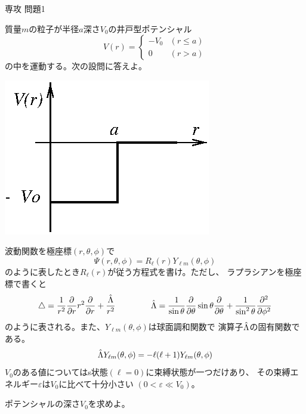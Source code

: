 \documentclass[fleqn]{jbook}
\begin{document}
\begin{question}{専攻 問題1}{}


\parbox[t]{100mm}{
質量$m$の粒子が半径$a$深さ$V_{0}$の井戸型ポテンシャル
%
\[ V(r)= \left\{ \begin{array}{lc}%
         -V_{0} & (r \leq a) \\
             0  & (r>a)      \end{array} \right. \]
%
の中を運動する。次の設問に答えよ。
%
}\parbox[t]{60mm}{\vspace*{-8mm}
\begin{center}
  \mbox{\includegraphics[clip]{1995phy1-1.eps}}
\end{center}}
%

\begin{subquestions}
\SubQuestion

  波動関数を極座標$(r,\theta,\phi)$で
  \[ \Psi (r ,\theta ,\phi )=R_{\ell}(r)Y_{\ell m}(\theta,\phi) \]
  のように表したとき$R_{\ell}(r)$が従う方程式を書け。ただし、
  ラプラシアンを極座標で書くと
%
  \[ \Laplacian = \frac{1}{r^2} \Partial{}{r}r^2 \Partial{}{r}%
                + \frac{\Operator{\Lambda}}{r^2}  \hspace{15mm}%
     \Operator{\Lambda} = \frac{1}{\sin \theta} \Partial{}{\theta} \sin\theta \Partial{}{\theta}%
                + \frac{1}{\sin^2\theta}\Partial{^2}{\phi^{2}} \]
%
  のように表される。また、$Y_{\ell m}(\theta,\phi)$は球面調和関数で
  演算子$\hat{\Lambda}$の固有関数である。
%
  \[ \hat{\Lambda} Y_{\ell m}(\theta,\phi) = -\ell(\ell+1)Y_{\ell m}(\theta,\phi) \]
%
  \SubSubQuestion
    $V_{0}$のある値についてはs状態$(\ell=0)$に束縛状態が一つだけあり、
    その束縛エネルギー$\varepsilon$は$V_{0}$に比べて十分小さい
    $(0<\varepsilon \ll V_0)$。

  \begin{subsubquestions}
  \SubSubQuestion
    ポテンシャルの深さ$V_{0}$を求めよ。


\end{subsubquestions}
\end{subquestions}
\end{question}
\end{document}
